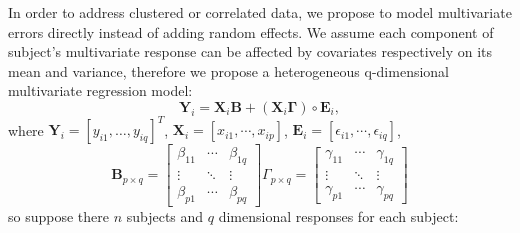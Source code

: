 \documentclass[12pt]{article}
\begin{document}
In order to address clustered or correlated data, we propose to model
multivariate errors directly instead of adding random effects. We
assume each component of subject's multivariate response can be
affected by covariates respectively on its mean and variance,
therefore we propose a heterogeneous q-dimensional multivariate
regression model:
\begin{displaymath}
  \bm{Y}_i = \bm{X}_i \bm{B} + (\bm{X}_i\bm{\Gamma}) \circ \bm{E}_i,
\end{displaymath}
where $\bm{Y}_i = [y_{i1}, \ldots, y_{iq}]^T$, $\bm{X}_i= [x_{i1},
\cdots, x_{ip}]$, $\bm{E}_i =[\epsilon_{i1}, \cdots, \epsilon_{iq}]$,
\begin{displaymath}
  \bm{B}_{p\times q} =
  \begin{bmatrix}
    \beta_{11}& \cdots & \beta_{1q} \\
    \vdots & \ddots & \vdots \\
    \beta_{p1} & \cdots & \beta_{pq}
  \end{bmatrix}
  \Gamma_{p\times q} =
  \begin{bmatrix}
    \gamma_{11} & \cdots & \gamma_{1q} \\
    \vdots & \ddots & \vdots \\
    \gamma_{p1} & \cdots & \gamma_{pq}
  \end{bmatrix}
\end{displaymath}
so suppose there $n$ subjects and $q$ dimensional responses for each
subject:
\end{document}

